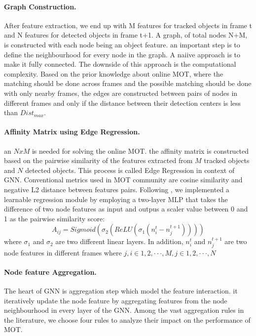 \documentclass[10pt,twocolumn,letterpaper]{article}
\begin{document}
\paragraph{Graph Construction.}
After feature extraction, we end up with M features for tracked objects in frame t and N features for detected objects in frame t+1. A graph, of total nodes N+M, is constructed with each node being an object feature. an important step is to define the neighbourhood for every node in the graph. A naiive approach is to make it fully connected. The downside of this approach is the computational complexity. Based on the prior knowledge about online MOT, where the matching should be done across frames and the possible matching should be done with only nearby frames, the edges are constructed between pairs of nodes in different frames and only if the distance between their detection centers is less than $Dist_{max}$.

\paragraph{Affinity Matrix using Edge Regression.}
an $NxM$ is needed for solving the online MOT.  the affinity matrix is constructed based on the pairwise similarity of the features extracted from $M$ tracked objects and $N$ detected objects. This process is called Edge Regression in context of GNN. Conventional metrics used in MOT community are cosine similarity and negative L2 distance between features pairs. Following \cite{weng2020gnn3dmot}, we implemented a learnable regression module by employing a two-layer MLP that takes the difference of two node features as input and outpus a scaler value between 0 and 1 as the pairwise similarity score: 
\begin{equation}
A_{ij} = Sigmoid(\sigma_{2}(ReLU(\sigma_{1}(n^{t}_{i} - n^{t+1}_{j}))))
\end{equation}
where $\sigma_{1}$ and $\sigma_{2}$ are two different linear layers. In addition, $n^{t}_{i}$ and $n^{t+1}_{j}$ are two node features in different frames where $j, i \in {1, 2, ···, M}, j \in {1, 2, ···, N}$
\paragraph{Node feature Aggregation.} The heart of GNN is aggregation step which model the feature interaction. it iteratively update the node feature by aggregating features from the node neighbourhood in every layer of the GNN. Among the vast aggregation rules in the literature, we choose four rules to analyze their impact on the performance of MOT.
\end{document}
